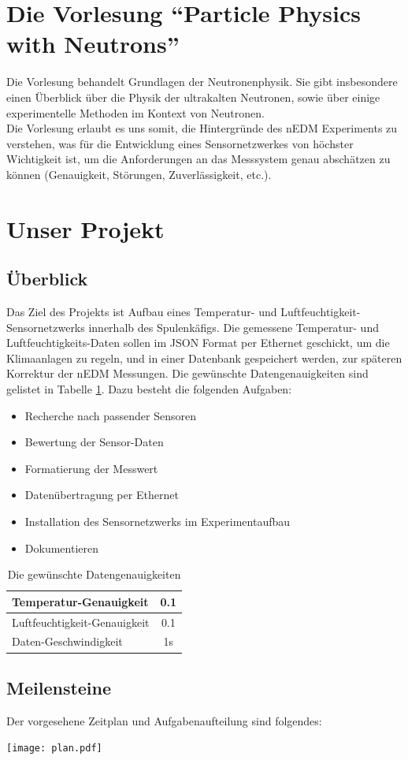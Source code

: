 \documentclass{article} %
\begin{document}
\section*{Die Vorlesung ``Particle Physics with Neutrons''}
Die Vorlesung behandelt Grundlagen der Neutronenphysik. Sie gibt insbesondere
einen Überblick über die Physik der ultrakalten Neutronen, sowie über einige
experimentelle Methoden im Kontext von Neutronen.\\
Die Vorlesung erlaubt es uns somit, die Hintergründe des nEDM Experiments zu
verstehen, was für die Entwicklung eines Sensornetzwerkes von höchster
Wichtigkeit ist, um die Anforderungen an das Messsystem genau abschätzen zu
können (Genauigkeit, Störungen, Zuverlässigkeit, etc.).
\section*{Unser Projekt}
\subsection*{Überblick}
Das Ziel des Projekts ist Aufbau eines Temperatur- und Luftfeuchtigkeit-
Sensornetzwerks innerhalb des Spulenkäfigs. Die gemessene Temperatur- und 
Luftfeuchtigkeits-Daten sollen im JSON Format per Ethernet geschickt, um 
die Klimaanlagen zu regeln, und in einer 
Datenbank gespeichert werden, zur späteren Korrektur der nEDM Messungen. 
Die gewünschte Datengenauigkeiten sind gelistet in Tabelle \ref{tab:genauigkeit}.
Dazu besteht die folgenden Aufgaben:
\begin{itemize}
\item Recherche nach passender Sensoren 
\item Bewertung der Sensor-Daten
\item Formatierung der Messwert 
\item Datenübertragung per Ethernet
\item Installation des Sensornetzwerks im Experimentaufbau
\item Dokumentieren
\end{itemize}
\begin{table}
  \centering
  \begin{tabular}{|l|c|}
    \hline
    Temperatur-Genauigkeit & 0.1 
    \\ \hline
    Luftfeuchtigkeit-Genauigkeit & 0.1
    \\ \hline
    Daten-Geschwindigkeit & 1s
    \\ \hline
  \end{tabular}
  \caption{Die gewünschte Datengenauigkeiten}
  \label{tab:genauigkeit}
\end{table}
\subsection*{Meilensteine}
Der vorgesehene Zeitplan und Aufgabenaufteilung sind folgendes:
\begin{center}
\texttt{[image: plan.pdf]}
\end{center}
\end{document}
